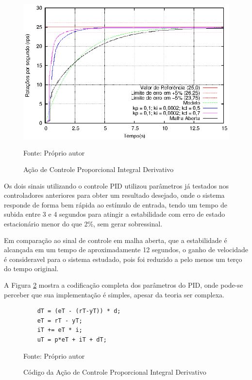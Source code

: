 \begin{figure}[!htb]
\centering
\caption{Ação de Controle Proporcional Integral Derivativo}
\center\includegraphics[scale=1.4]{./imagens/acaoPID.eps}
\label{fig:acaoPID}

{\small Fonte: Próprio autor}
\end{figure}

Os dois sinais utilizando o controle PID utilizou parâmetros já testados nos controladores anteriores para obter um resultado desejado, onde o sistema responde de forma bem rápida ao estímulo de entrada, tendo um tempo de subida entre 3 e 4 segundos para atingir a estabilidade com erro de estado estacionário menor do que 2\%, sem gerar sobressinal.


Em comparação ao sinal de controle em malha aberta, que a estabilidade é alcançada em um tempo de aproximadamente 12 segundos, o ganho de velocidade é consideravel para o sistema estudado, pois foi reduzido a pelo menos um terço do tempo original.

A Figura \ref{fig:codigoControladorPID} mostra a codificação completa dos parâmetros do PID, onde pode-se perceber que sua implementação é simples, apesar da teoria ser complexa. 

\begin{figure}[!htb]
\centering
\caption{Código da Ação de Controle Proporcional Integral Derivativo}
\begin{minipage}{0.8\linewidth}
\lstset{firstnumber=13}
\begin{lstlisting}
    dT = (eT - (rT-yT)) * d;
    eT = rT - yT;
    iT += eT * i; 
    uT = p*eT + iT + dT;
\end{lstlisting}
\end{minipage}
\label{fig:codigoControladorPID}

{\small Fonte: Próprio autor}
\end{figure}


